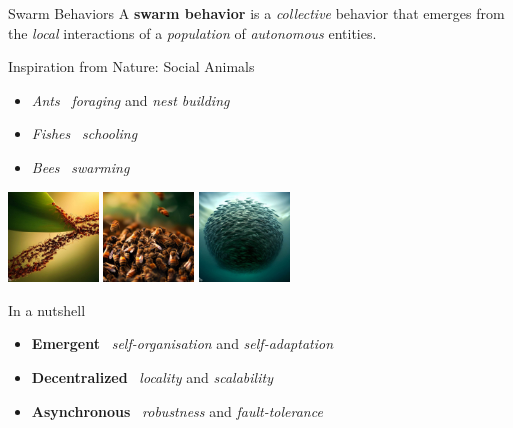 \documentclass[presentation, 9pt]{beamer}\mode<presentation>{\usetheme{AMSBolognaFC}}
\begin{document}
\begin{frame}{Swarm Behaviors}
A \textbf{swarm behavior} is a \emph{collective} behavior that emerges from the \emph{local} interactions of a \emph{population} of \emph{autonomous} entities.
\begin{block}{Inspiration from Nature: Social Animals}
\begin{itemize}
	\item \emph{Ants} \faArrowRight \, \emph{foraging} and \emph{nest building}
	\item \emph{Fishes} \faArrowRight \, \emph{schooling}
	\item \emph{Bees} \faArrowRight \, \emph{swarming}
\end{itemize}
\end{block}

\centering
\includegraphics[width=0.18\textwidth]{img/ants.jpeg}
\includegraphics[width=0.18\textwidth]{img/bee.jpeg}
\includegraphics[width=0.18\textwidth]{img/fishes.jpeg}

\begin{alertblock}{In a nutshell}
\begin{itemize}
	\item \textbf{Emergent} \faArrowRight \, \emph{self-organisation} and \emph{self-adaptation}
	\item \textbf{Decentralized} \faArrowRight \, \emph{locality} and \emph{scalability}
	\item \textbf{Asynchronous} \faArrowRight \, \emph{robustness} and \emph{fault-tolerance}
\end{itemize}	
\end{alertblock}
\end{frame}
\end{document}
